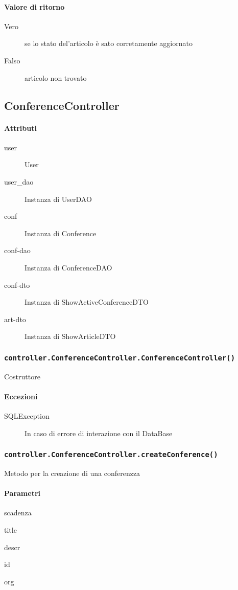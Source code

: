 \paragraph{Valore di ritorno}
\begin{description}
\item[Vero] se lo stato del'articolo è sato corretamente aggiornato
\item[Falso] articolo non trovato
\end{description}



\subsection{ConferenceController}
\paragraph{Attributi}
\begin{description}
\item[user] User 
\item[user_dao] Instanza di  UserDAO
\item[conf] Instanza di Conference
\item[conf-dao] Instanza di ConferenceDAO
\item[conf-dto] Instanza di ShowActiveConferenceDTO
\item[art-dto] Instanza di ShowArticleDTO
\end{description}

\subsubsection{\texttt{controller.ConferenceController.ConferenceController()}}
Costruttore
\paragraph{Eccezioni}
\begin{description}
\item[SQLException] In caso di errore di interazione con il DataBase
\end{description}

\subsubsection{\texttt{controller.ConferenceController.createConference()}}
Metodo per la creazione di una conferenzza
\paragraph{Parametri}
\begin{description}
\item scadenza
\item title
\item descr
\item id
\item org
\end{description}
